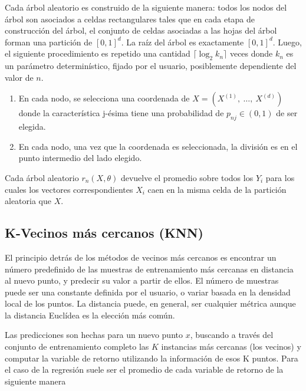     \par Cada árbol aleatorio es construido de la siguiente manera: todos los nodos
      del árbol son asociados a celdas rectangulares tales que en cada etapa de
      construcción del árbol, el conjunto de celdas asociadas a las hojas del árbol
      forman una partición de $[0, 1]^{d}$. La raíz del árbol es exactamente $[0, 1]^{d}$.
      Luego, el siguiente procedimiento es repetido una cantidad $\lceil \log_{2}k_{n} \rceil$ veces
      donde $k_{n}$ es un parámetro determinístico, fijado por el usuario, posiblemente
      dependiente del valor de $n$.

      \begin{enumerate}
        \item En cada nodo, se selecciona una coordenada de $X = (X^{(1)}, \ \dots,\ X^{(d)})$
              donde la característica j-ésima tiene una probabilidad de $p_{nj} \in (0,1)$
              de ser elegida.
        \item En cada nodo, una vez que la coordenada es seleccionada, la división es
              en el punto intermedio del lado elegido.
      \end{enumerate}

      Cada árbol aleatorio $r_{n}(X, \theta)$ devuelve el promedio sobre todos los
      $Y_{i}$ para los cuales los vectores correspondientes $X_{i}$ caen en la misma
      celda de la partición aleatoria que $X$.


  \subsection{K-Vecinos más cercanos (KNN)}
    \par El principio detrás de los métodos de vecinos más cercanos es encontrar un
      número predefinido de las muestras de entrenamiento más cercanas en distancia
      al nuevo punto, y predecir su valor a partir de ellos.
      El número de muestras puede ser una constante definida por el usuario, o
      variar basada en la densidad local de los puntos. La distancia puede, en general,
      ser cualquier métrica aunque la distancia Euclídea es la elección más común.

    \par Las predicciones son hechas para un nuevo punto $x$, buscando a través del conjunto
      de entrenamiento completo las $K$ instancias más cercanas (los vecinos) y computar
      la variable de retorno utilizando la información de esos K puntos. Para el caso
      de la regresión suele ser el promedio de cada variable de retorno de la siguiente
      manera

